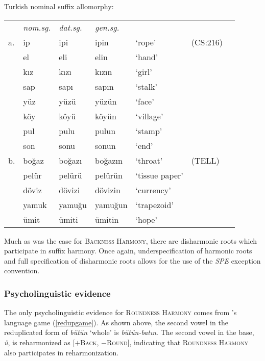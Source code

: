 \begin{example}
Turkish nominal suffix allomorphy: 

\vspace{0.5\baselineskip}
\begin{tabular}{l l l l l l l}
   & \emph{nom.sg.} & \emph{dat.sg.} & \emph{gen.sg.}  \\
a. & ip             & ipi            & ipin           & `rope' & (CS:216) \\
   & el             & eli            & elin           & `hand'    \\
   & kız            & kızı           & kızın          & `girl'    \\
   & sap            & sapı           & sapın          & `stalk'   \\
   & yüz            & yüzü           & yüzün          & `face'    \\
   & köy            & köyü           & köyün          & `village' \\
   & pul            & pulu           & pulun          & `stamp'   \\
   & son            & sonu           & sonun          & `end'     \\
b. & boğaz          & boğazı         & boğazın        & `throat'  & (TELL) \\
   & pelür          & pelürü         & pelürün        & `tissue paper' \\
   & döviz          & dövizi         & dövizin        & `currency' \\
   & yamuk          & yamuğu         & yamuğun        & `trapezoid' \\
   & ümit           & ümiti          & ümitin         & `hope'     \\
\end{tabular}
\end{example}

\noindent
Much as was the case for \textsc{Backness Harmony}, there are disharmonic roots which participate in suffix harmony. Once again, underspecification of harmonic roots and full specification of disharmonic roots allows for the use of the \emph{SPE} exception convention. 

\subsubsection{Psycholinguistic evidence}

The only psycholinguistic evidence for \textsc{Roundness Harmony} comes from \citeauthor{Harrison2001}'s language game (\ref{redupgame}). As shown above, the second vowel in the reduplicated form of \emph{bütün} `whole' is \emph{bütün-batın}. The second vowel in the base, \emph{ü}, is reharmonized as [$+$\textsc{Back}, $-$\textsc{Round}], indicating that \textsc{Roundness Harmony} also participates in reharmonization.
